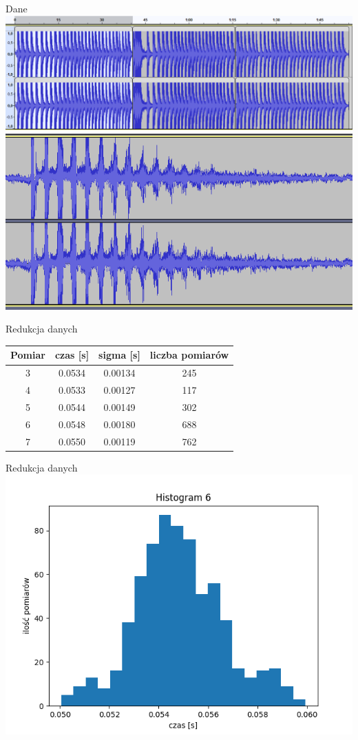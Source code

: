 \documentclass{beamer}
\begin{document}
\begin{frame}{Dane}
	\centering
	\includegraphics[width=\linewidth]{Data.png} \pause
	\includegraphics[width=0.7\linewidth]{Przechwycenie obrazu ekranu_2024-05-04_14-41-05.png}
\end{frame}

\begin{frame}{Redukcja danych}
	\centering
	\begin{tabular}{cccc}
		\toprule
		Pomiar & czas [s] & sigma [s] & liczba pomiarów \\
		\midrule
		3      & 0.0534   & 0.00134   & 245             \\
		4      & 0.0533   & 0.00127   & 117             \\
		5      & 0.0544   & 0.00149   & 302             \\
		6      & 0.0548   & 0.00180   & 688             \\
		7      & 0.0550   & 0.00119   & 762             \\
		\bottomrule
	\end{tabular}

\end{frame}

\begin{frame}{Redukcja danych}
\centering
\includegraphics[width=0.9\linewidth]{Hist6.png}
\end{frame}
\end{document}
